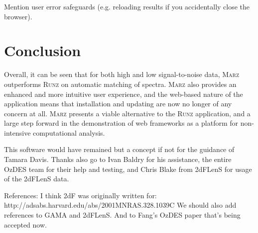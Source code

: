 \documentclass[iop]{emulateapj}
\newcommand{\tamcom}{\color{red}}
\newcommand{\runz}{\textsc{Runz}}
\newcommand{\thesisname}{\textsc{Marz}}
\begin{document}
{\tamcom Mention user error safeguards (e.g. reloading results if you accidentally close the browser).}








\section{Conclusion}

Overall, it can be seen that for both high and low signal-to-noise data, \thesisname{} outperforms \runz{} on automatic matching of spectra. \thesisname{} also provides an enhanced and more intuitive user experience, and the web-based nature of the application means that installation and updating are now no longer of any concern at all.   \thesisname{} presents a viable alternative to the \runz{} application, and a large step forward in the demonstration of web frameworks as a platform for non-intensive computational analysis.

\acknowledgments

This software would have remained but a concept if not for the guidance of Tamara Davis. Thanks also go to Ivan Baldry for his assistance, the entire OzDES team for their help and testing, and Chris Blake from 2dFLenS for usage of the 2dFLenS data.

{\tamcom References: I think 2dF was originally written for: http://adsabs.harvard.edu/abs/2001MNRAS.328.1039C  We should also add references to GAMA and 2dFLenS.  And to Fang's OzDES paper that's being accepted now. }


 

\end{document}
